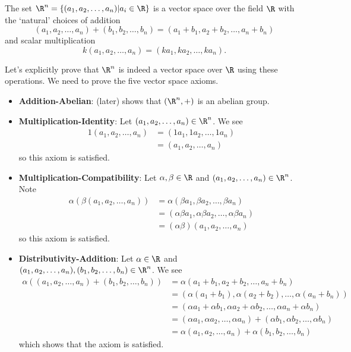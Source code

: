 \begin{example}\label{example-R^n-is-vector-space}
    The set $\R^n = \{(a_1, a_2, \dots, a_n) \vert a_i \in \R\}$ is a vector space over the field $\R$ with the `natural' choices of addition
    \[
        (a_1, a_2, \dots, a_n) + (b_1, b_2, \dots, b_n) = (a_1 + b_1, a_2 + b_2, \dots, a_n + b_n)
    \]
    and scalar multiplication
    \[
        k(a_1, a_2, \dots, a_n) = (ka_1, ka_2, \dots, ka_n).
    \]

    Let's explicitly prove that $\R^n$ is indeed a vector space over $\R$ using these operations. We need to prove the five vector space axioms.
    \begin{itemize}
        \item \textbf{Addition-Abelian}:  (later) shows that $(\R^n, +)$ is an abelian group.
        
        \item \textbf{Multiplication-Identity}: Let $(a_1, a_2, \dots, a_n) \in \R^n$. We see
        \begin{align*}
            1(a_1, a_2, \dots, a_n) &= (1a_1, 1a_2, \dots, 1a_n)\\
            &= (a_1, a_2, \dots, a_n)
        \end{align*}
        so this axiom is satisfied.

        \item \textbf{Multiplication-Compatibility}: Let $\alpha, \beta \in \R$ and $(a_1, a_2, \dots, a_n) \in \R^n$. Note
        \begin{align*}
            \alpha\left(\beta(a_1, a_2, \dots, a_n)\right) &= \alpha(\beta a_1, \beta a_2, \dots, \beta a_n)\\
            &= (\alpha\beta a_1, \alpha\beta a_2, \dots, \alpha\beta a_n)\\
            &= (\alpha\beta)(a_1, a_2, \dots, a_n)
        \end{align*}
        so this axiom is satisfied.
        
        \item \textbf{Distributivity-Addition}: Let $\alpha \in \R$ and $(a_1, a_2, \dots, a_n), (b_1, b_2, \dots, b_n) \in \R^n$. We see
        \begin{align*}
            \alpha\left((a_1, a_2, \dots, a_n) + (b_1, b_2, \dots, b_n)\right) &= \alpha(a_1 + b_1, a_2 + b_2, \dots, a_n + b_n)\\
            &= (\alpha(a_1 + b_1), \alpha(a_2 + b_2), \dots, \alpha(a_n + b_n))\\
            &= (\alpha a_1 + \alpha b_1, \alpha a_2 + \alpha b_2, \dots, \alpha a_n + \alpha b_n)\\
            &= (\alpha a_1, \alpha a_2, \dots, \alpha a_n) + (\alpha b_1, \alpha b_2, \dots, \alpha b_n)\\
            &= \alpha(a_1, a_2, \dots, a_n) + \alpha(b_1, b_2, \dots, b_n)
        \end{align*}
        which shows that the axiom is satisfied.
        

\end{itemize}
\end{example}
